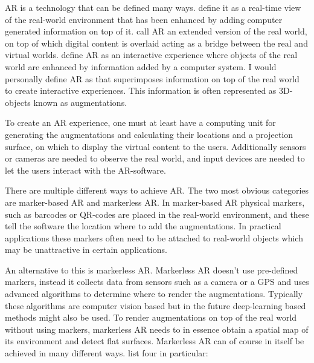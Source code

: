 AR is a technology that can be defined many ways. \textcite{reyesEtAl2016} 
define it as a real-time view of the real-world environment that has been 
enhanced by adding computer generated information on top of it. 
\textcite{ghasemi} call AR an extended version of the real world, on top of 
which digital content is overlaid acting as a bridge between the real and 
virtual worlds. \textcite{minaee2022modernaugmentedrealityapplications} 
define AR as an interactive experience where objects of the real world are 
enhanced by information added by a computer system. I would personally define 
AR as that superimposes information on top of the real world to create 
interactive experiences. This information is often represented as 3D-objects 
known as augmentations.\cite{estrada}\cite{VanGestel2024}\par
	To create an AR experience, one must at least have a computing unit 
for generating the augmentations and calculating their locations and a 
projection surface, on which to display the virtual content to the 
users.\cite{ghasemi} Additionally sensors or cameras are needed to observe 
the real world, and input devices are needed to let the users interact with 
the AR-software.\cite{reyesEtAl2016}\cite{minaee2022modernaugmentedrealityapplications}\par
	There are multiple different ways to achieve AR. The two most obvious 
categories are marker-based AR and markerless AR.\cite{estrada} In 
marker-based AR physical markers, such as barcodes or QR-codes are placed in 
the real-world environment, and these tell the software the location where to 
add the augmentations.\cite{estrada}\cite{reyesEtAl2016} In practical 
applications these markers often need to be attached to real-world 
objects\cite{ghasemi} which may be unattractive in certain applications.\par
	An alternative to this is markerless AR. Markerless AR doesn't use 
pre-defined markers, instead it collects data from sensors such as a camera 
or a GPS and uses advanced algorithms to determine where to render the 
augmentations.\cite{estrada} Typically these algorithms are computer vision 
based\cite{estrada} but in the future deep-learning based methods might also 
be used\cite{ghasemi}. To render augmentations on top of the real world without 
using markers, markerless AR needs to in essence obtain a spatial map of its 
environment\cite{ghasemi} and detect flat surfaces.\cite{ghasemi} Markerless 
AR can of course in itself be achieved in many different ways. 
\textcite{estrada} list four in particular: \par
